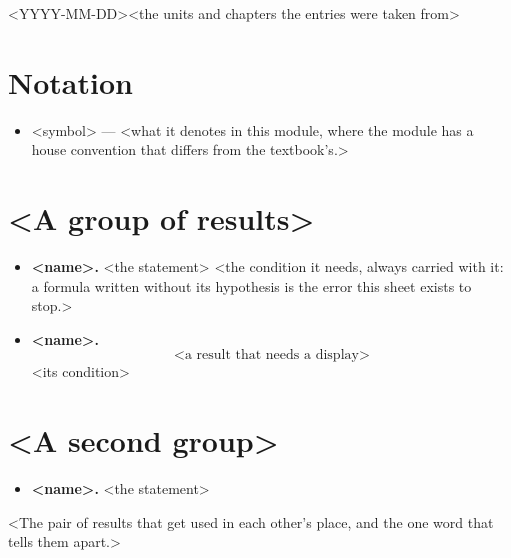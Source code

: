 \documentclass[a4paper,10pt]{article}
\begin{document}
%
  {<YYYY-MM-DD>}{<the units and chapters the entries were taken from>}

\section{Notation}
\begin{itemize}
  \item <symbol> --- <what it denotes in this module, where the module has a house convention
        that differs from the textbook's.>
\end{itemize}

\section{<A group of results>}
\begin{itemize}
  \item \textbf{<name>.} <the statement> \quad <the condition it needs, always carried with it:
        a formula written without its hypothesis is the error this sheet exists to stop.>
  \item \textbf{<name>.}
        \[
          \text{<a result that needs a display>}
        \]
        <its condition>
\end{itemize}

\section{<A second group>}
\begin{itemize}
  \item \textbf{<name>.} <the statement> 
\end{itemize}

\begin{warning}
<The pair of results that get used in each other's place, and the one word that tells them apart.>
\end{warning}
\end{document}
